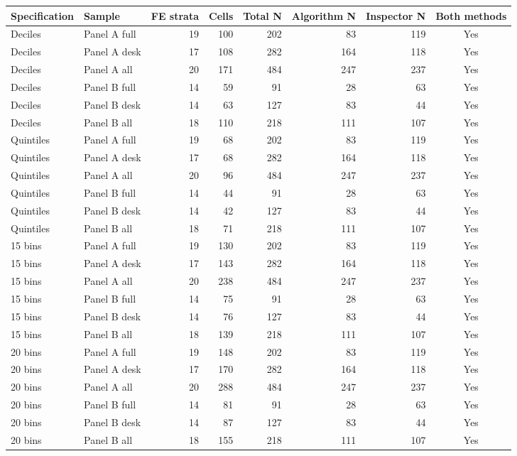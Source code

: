 \begin{tabular}{llrrrrrc}
\toprule
Specification & Sample & FE strata & Cells & Total N & Algorithm N & Inspector N & Both methods \\
\midrule
Deciles & Panel A full & 19 & 100 & 202 & 83 & 119 & Yes \\
Deciles & Panel A desk & 17 & 108 & 282 & 164 & 118 & Yes \\
Deciles & Panel A all & 20 & 171 & 484 & 247 & 237 & Yes \\
Deciles & Panel B full & 14 & 59 & 91 & 28 & 63 & Yes \\
Deciles & Panel B desk & 14 & 63 & 127 & 83 & 44 & Yes \\
Deciles & Panel B all & 18 & 110 & 218 & 111 & 107 & Yes \\
Quintiles & Panel A full & 19 & 68 & 202 & 83 & 119 & Yes \\
Quintiles & Panel A desk & 17 & 68 & 282 & 164 & 118 & Yes \\
Quintiles & Panel A all & 20 & 96 & 484 & 247 & 237 & Yes \\
Quintiles & Panel B full & 14 & 44 & 91 & 28 & 63 & Yes \\
Quintiles & Panel B desk & 14 & 42 & 127 & 83 & 44 & Yes \\
Quintiles & Panel B all & 18 & 71 & 218 & 111 & 107 & Yes \\
15 bins & Panel A full & 19 & 130 & 202 & 83 & 119 & Yes \\
15 bins & Panel A desk & 17 & 143 & 282 & 164 & 118 & Yes \\
15 bins & Panel A all & 20 & 238 & 484 & 247 & 237 & Yes \\
15 bins & Panel B full & 14 & 75 & 91 & 28 & 63 & Yes \\
15 bins & Panel B desk & 14 & 76 & 127 & 83 & 44 & Yes \\
15 bins & Panel B all & 18 & 139 & 218 & 111 & 107 & Yes \\
20 bins & Panel A full & 19 & 148 & 202 & 83 & 119 & Yes \\
20 bins & Panel A desk & 17 & 170 & 282 & 164 & 118 & Yes \\
20 bins & Panel A all & 20 & 288 & 484 & 247 & 237 & Yes \\
20 bins & Panel B full & 14 & 81 & 91 & 28 & 63 & Yes \\
20 bins & Panel B desk & 14 & 87 & 127 & 83 & 44 & Yes \\
20 bins & Panel B all & 18 & 155 & 218 & 111 & 107 & Yes \\

\end{tabular}
